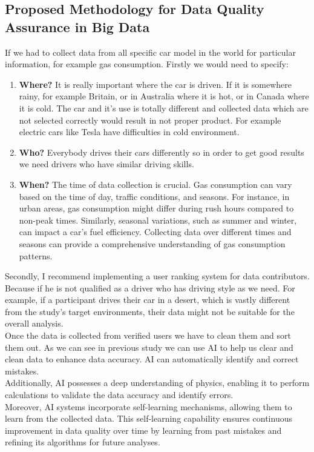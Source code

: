 \documentclass[10pt,a4paper]{article}
\begin{document}
\subsection{Proposed Methodology for Data Quality Assurance in Big Data}
If we had to collect data from all specific car model in the world for particular information, for example gas consumption.
Firstly we would need to specify:
\begin{enumerate}
    \item \textbf{Where?} It is really important where the car is driven. If it is somewhere rainy, for example Britain, or in Australia where it is hot, or in Canada where it is cold. The car and it's use is totally different and collected data which are not selected correctly would result in not proper product. For example electric cars like Tesla have difficulties in cold environment.
    \item \textbf{Who?} Everybody drives their cars differently so in order to get good results we need drivers who have similar driving skills.
    \item \textbf{When?} The time of data collection is crucial. Gas consumption can vary based on the time of day, traffic conditions, and seasons. For instance, in urban areas, gas consumption might differ during rush hours compared to non-peak times. Similarly, seasonal variations, such as summer and winter, can impact a car's fuel efficiency. Collecting data over different times and seasons can provide a comprehensive understanding of gas consumption patterns.
\end{enumerate}
Secondly, I recommend implementing a user ranking system for data contributors. Because if he is not qualified as a driver who has driving style as we need. For example, if a participant drives their car in a desert, which is vastly different from the study's target environments, their data might not be suitable for the overall analysis.\cite{8605945}
\\Once the data is collected from verified users we have to clean them and sort them out.
As we can see in previous study we can use AI to help us clear and clean data to enhance data accuracy. AI can automatically identify and correct mistakes. \\Additionally, AI possesses a deep understanding of physics, enabling it to perform calculations to validate the data accuracy and identify errors. \\Moreover, AI systems incorporate self-learning mechanisms, allowing them to learn from the collected data. This self-learning capability ensures continuous improvement in data quality over time by learning from past mistakes and refining its algorithms for future analyses.\cite{6949519}
\end{document}
